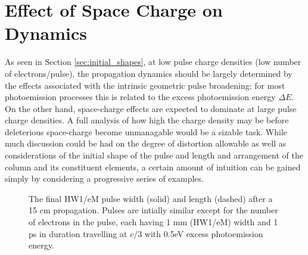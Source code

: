 
\section{Effect of Space Charge on Dynamics} \label{sec:free_spacecharge}

As seen in Section \ref{sec:initial_shapes}, at low pulse charge densities (low number of electrons/pulse), the propagation dynamics should be largely determined by the effects associated with the intrinsic geometric pulse broadening; for most photoemission processes this is related to the excess photoemission energy $\Delta E$.
On the other hand, space-charge effects are expected to dominate at large pulse charge densities.
A full analysis of how high the charge density may be before deleterious space-charge become unmanagable would be a sizable task.
While much discussion could be had on the degree of distortion allowable as well as considerations of the initial shape of the pulse and length and arrangement of the column and its constituent elements, a certain amount of intuition can be gained simply by considering a progressive series of examples.

\begin{figure}
  \centering
  \begin{tikzpicture}
    
  \end{tikzpicture}
  \caption[Idealistic free-space pulse evolution vs charge density]{
    The final HW1/eM pulse width (solid) and length (dashed) after a 15 cm propagation. 
    Pulses are intially similar except for the number of electrons in the pulse, each having 1 mm (HW1/eM) width and 1 ps in duration travelling at $c/3$ with 0.5eV excess photoemission energy.
  }
  \label{fig:spacecharge_noacc}
\end{figure}

